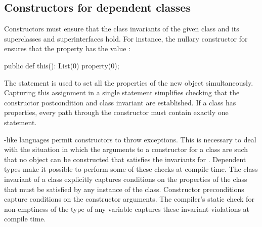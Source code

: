 
\subsection{Constructors for dependent classes}


Constructors must ensure that the class invariants of the given
class and its superclasses and superinterfaces hold.
For instance, the
nullary constructor for  ensures that the property
 has the value :
\begin{xtennoindent}
  public def this(): List(0) { property(0); }
\end{xtennoindent}
The  statement is used to set all the properties
of the new object simultaneously.  Capturing this assignment in
a single statement simplifies checking that the constructor
postcondition and class invariant are established.  If a class
has properties, every path through the constructor must contain
exactly one  statement.

\java{}-like languages permit constructors to throw exceptions. This
is necessary to deal with the situation in which the arguments to a
constructor for a class  are such that no object can be
constructed that satisfies the invariants for . Dependent
types make it possible to perform some of these checks at
compile time. The class invariant of a class explicitly captures
conditions on the properties of the class that must be satisfied by
any instance of the class.  Constructor preconditions capture
conditions on the constructor arguments.
The compiler's static check for
non-emptiness of the type of any variable captures these invariant
violations at compile time.

